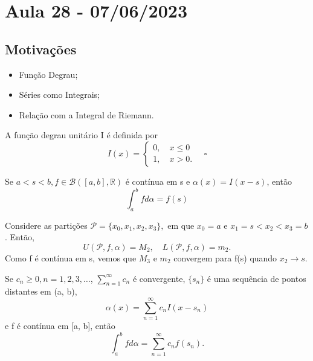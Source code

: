 \documentclass[Analysis/analysis_notes.tex]{subfiles}
\begin{document}
\section{Aula 28 - 07/06/2023}
\subsection{Motivações}
\begin{itemize}
	\item Função Degrau;
	\item Séries como Integrais;
	\item Relação com a Integral de Riemann.
\end{itemize}
\begin{def*}
	A função degrau unitário I é definida por
	\[
		I(x) = \left\{\begin{array}{ll}
			0,\quad x\leq 0 \\
			1,\quad x > 0.
		\end{array}\right.\quad \square
	\]
\end{def*}
\begin{theorem*}
	Se \(a < s < b, f\in \mathcal{B}([a, b], \mathbb{R})\) é contínua em s e \(\alpha (x) = I(x-s)\), então
	\[
		\int_{a}^{b} f d\alpha = f(s)
	\]
\end{theorem*}
\begin{proof*}
	Considere as partições \(\mathcal{P} = \{x_{0}, x_1, x_2, x_3\},\) em que \(x_{0} = a\) e \(x_1 = s < x_2 < x_3 = b\). Então,
	\[
		U(\mathcal{P}, f, \alpha ) = M_{2}, \quad L(\mathcal{P}, f, \alpha ) = m_{2}.
	\]
	Como f é contínua em s, vemos que \(M_3\) e \(m_2\) convergem para f(s) quando \(x_2\to s.\) \qedsymbol
\end{proof*}
\begin{theorem*}
	Se \(c_{n}\geq 0, n = 1, 2, 3, \dotsc \), \(\sum\limits_{n=1}^{\infty}c_{n}\) é convergente, \(\{s_{n}\}\) é uma sequência de pontos distantes em (a, b),
	\[
		\alpha (x) = \sum\limits_{n=1}^{\infty}c_{n}I(x-s_{n})
	\]
	e f é contínua em [a, b], então
	\[
		\int_{a}^{b}f d\alpha  = \sum\limits_{n=1}^{\infty}c_{n}f(s_{n}).
	\]
\end{theorem*}
\end{document}
